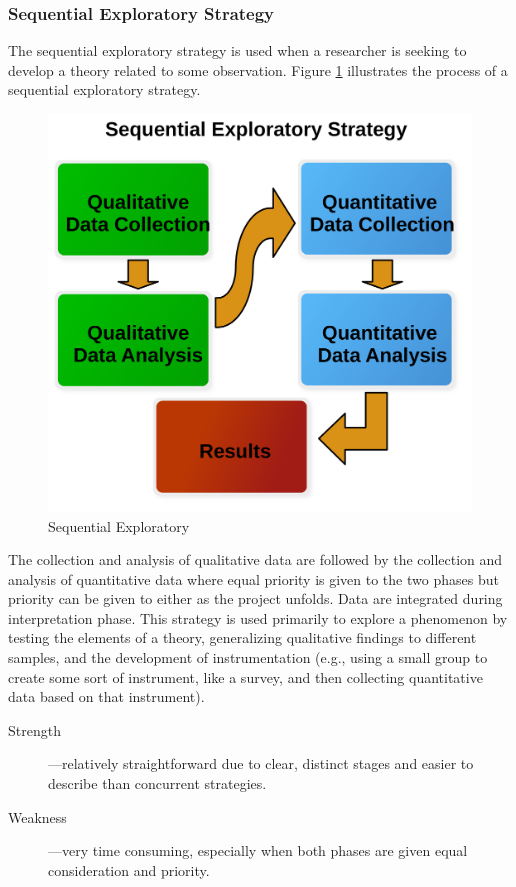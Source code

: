 \subsubsection{Sequential Exploratory Strategy}

The sequential exploratory strategy is used when a researcher is seeking to develop a theory related to some observation. Figure \ref{14:fig91} illustrates the process of a sequential exploratory strategy. 

\begin{figure}[H]
	\centering
	\includegraphics[width=\maxwidth{.95\linewidth}]{gfx/14-Seq_Explore}
	\caption{Sequential Exploratory}
	\label{14:fig91}
\end{figure}

The collection and analysis of qualitative data are followed by the collection and analysis of quantitative data where equal priority is given to the two phases but priority can be given to either as the project unfolds. Data are integrated during interpretation phase. This strategy is used primarily to explore a phenomenon by testing the elements of a theory, generalizing qualitative findings to different samples, and the development of instrumentation (e.g., using a small group to create some sort of instrument, like a survey, and then collecting quantitative data based on that instrument).

\begin{description}
	\item[Strength]---relatively straightforward due to clear, distinct stages and easier to describe than concurrent strategies.
	\item[Weakness]---very time consuming, especially when both phases are given equal consideration and priority.
\end{description}

